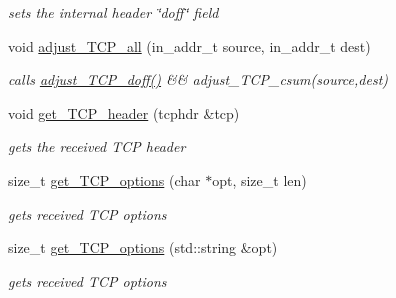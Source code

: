 \begin{CompactItemize}
\begin{CompactList}\small\item\em sets the internal header \char`\"{}doff\char`\"{} field \item\end{CompactList}\item 
void \hyperlink{classsocketpp_1_1TCP__RawSocket_0a1017145ae76253dfca51cbd672fae7}{adjust\_\-TCP\_\-all} (in\_\-addr\_\-t source, in\_\-addr\_\-t dest)
\begin{CompactList}\small\item\em calls \hyperlink{classsocketpp_1_1TCP__RawSocket_029eb8bfbf19531253edf046775d9f5f}{adjust\_\-TCP\_\-doff()} \&\& adjust\_\-TCP\_\-csum(source,dest) \item\end{CompactList}\item 
void \hyperlink{classsocketpp_1_1TCP__RawSocket_d7e8b2a67c856e11f0e6cfff5f8b8705}{get\_\-TCP\_\-header} (tcphdr \&tcp)
\begin{CompactList}\small\item\em gets the received TCP header \item\end{CompactList}\item 
size\_\-t \hyperlink{classsocketpp_1_1TCP__RawSocket_75e954caea8187c5077821cd449199e7}{get\_\-TCP\_\-options} (char $\ast$opt, size\_\-t len)
\begin{CompactList}\small\item\em gets received TCP options \item\end{CompactList}\item 
size\_\-t \hyperlink{classsocketpp_1_1TCP__RawSocket_67ab79f764a710067590427cb35aeea0}{get\_\-TCP\_\-options} (std::string \&opt)
\begin{CompactList}\small\item\em gets received TCP options \item\end{CompactList}\end{CompactItemize}
